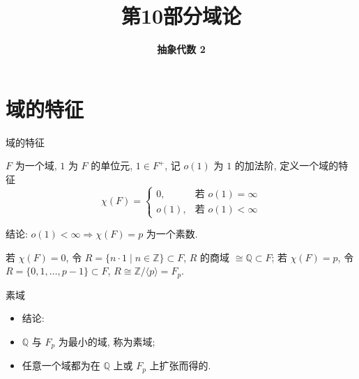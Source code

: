 \everymath{\displaystyle}



\title[域论]{\texorpdfstring{\LARGE \bfseries 第10部分\quad 域论}{第10部分 域论}}
\author[抽象代数 2]{\Large \bfseries 抽象代数 2}
\date{}





\begin{frame}

\titlepage %

\end{frame}


\section[特征]{域的特征}


\begin{frame}{域的特征}

$F$ 为一个域, $1$ 为 $F$ 的单位元, $1 \in F^{+}$, 记 $o(1)$ 为 $1$ 的加法阶,
定义一个域的特征
\[
\chi(F) =
\begin{cases}
0, & \text{若 } o(1) = \infty \\
o(1), & \text{若 } o(1) < \infty
\end{cases}
\]

\pause

结论: $o(1) < \infty \Longrightarrow \chi(F) = p$ 为一个素数.

\pause

若 $\chi(F) = 0$, 令 $R = \{ n \cdot 1 \mid n \in \mathbb{Z} \} \subset F$,
$R$ 的商域 $\cong \mathbb{Q} \subset F$;
若 $\chi(F) = p$, 令 $R = \{ 0, 1, \dots, p - 1 \} \subset F$,
$R \cong \mathbb{Z}/\langle p \rangle = F_p$.

\end{frame}


\begin{frame}{素域}

\begin{itemize}
\item 结论:
\item {} $\mathbb{Q}$ 与 $F_p$ 为最小的域, 称为素域;
\item {} 任意一个域都为在 $\mathbb{Q}$ 上或 $F_p$ 上扩张而得的.
\end{itemize}

\end{frame}

